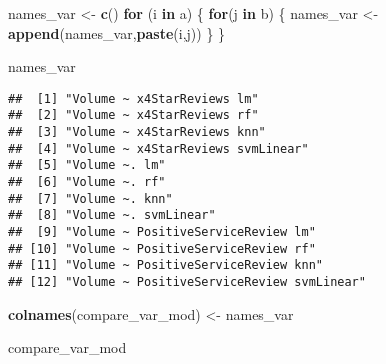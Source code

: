 \documentclass[]{article}
\newenvironment{Shaded}{\begin{snugshade}}{\end{snugshade}}
\newcommand{\KeywordTok}[1]{\textcolor[rgb]{0.13,0.29,0.53}{\textbf{#1}}}
\newcommand{\StringTok}[1]{\textcolor[rgb]{0.31,0.60,0.02}{#1}}
\newcommand{\ControlFlowTok}[1]{\textcolor[rgb]{0.13,0.29,0.53}{\textbf{#1}}}
\newcommand{\NormalTok}[1]{#1}
\begin{document}
\begin{Shaded}
\begin{Highlighting}[]
\NormalTok{names_var <-}\StringTok{ }\KeywordTok{c}\NormalTok{()}
\ControlFlowTok{for}\NormalTok{ (i }\ControlFlowTok{in}\NormalTok{ a) \{}
  \ControlFlowTok{for}\NormalTok{(j }\ControlFlowTok{in}\NormalTok{ b) \{}
\NormalTok{    names_var <-}\StringTok{ }\KeywordTok{append}\NormalTok{(names_var,}\KeywordTok{paste}\NormalTok{(i,j))}
\NormalTok{  \}}
\NormalTok{\}}


\NormalTok{names_var}
\end{Highlighting}
\end{Shaded}

\begin{verbatim}
##  [1] "Volume ~ x4StarReviews lm"               
##  [2] "Volume ~ x4StarReviews rf"               
##  [3] "Volume ~ x4StarReviews knn"              
##  [4] "Volume ~ x4StarReviews svmLinear"        
##  [5] "Volume ~. lm"                            
##  [6] "Volume ~. rf"                            
##  [7] "Volume ~. knn"                           
##  [8] "Volume ~. svmLinear"                     
##  [9] "Volume ~ PositiveServiceReview lm"       
## [10] "Volume ~ PositiveServiceReview rf"       
## [11] "Volume ~ PositiveServiceReview knn"      
## [12] "Volume ~ PositiveServiceReview svmLinear"
\end{verbatim}

\begin{Shaded}
\begin{Highlighting}[]
\KeywordTok{colnames}\NormalTok{(compare_var_mod) <-}\StringTok{ }\NormalTok{names_var}

\NormalTok{compare_var_mod}
\end{Highlighting}
\end{Shaded}
\end{document}
